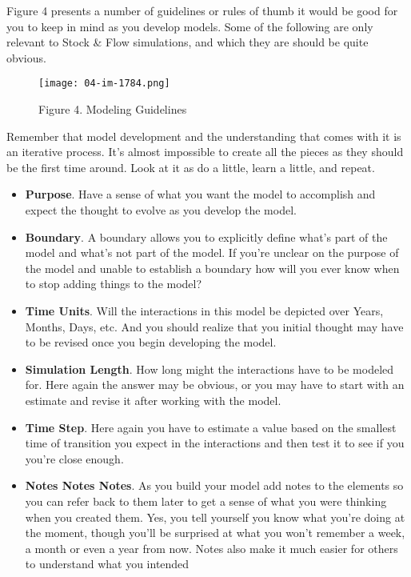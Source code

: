 \documentclass[]{memoir}
\makeatletter
\def\maxwidth{\ifdim\Gin@nat@width>\linewidth\linewidth
\else\Gin@nat@width\fi}
\let\Oldincludegraphics\includegraphics
\renewcommand{\includegraphics}[1]{\Oldincludegraphics[width=\maxwidth]{#1}}
\makeatother
\begin{document}
Figure 4 presents a number of guidelines or rules of thumb it would be
good for you to keep in mind as you develop models. Some of the
following are only relevant to Stock \& Flow simulations, and which they
are should be quite obvious.

\begin{figure}[htbp]
\centering
\texttt{[image: 04-im-1784.png]}
\caption{Figure 4. Modeling Guidelines}
\end{figure}

Remember that model development and the understanding that comes with it
is an iterative process. It's almost impossible to create all the pieces
as they should be the first time around. Look at it as do a little,
learn a little, and repeat.

\begin{itemize}
\itemsep1pt\parskip0pt
\item
  \textbf{Purpose}. Have a sense of what you want the model to
  accomplish and expect the thought to evolve as you develop the model.
\item
  \textbf{Boundary}. A boundary allows you to explicitly define what's
  part of the model and what's not part of the model. If you're unclear
  on the purpose of the model and unable to establish a boundary how
  will you ever know when to stop adding things to the model?
\item
  \textbf{Time Units}. Will the interactions in this model be depicted
  over Years, Months, Days, etc. And you should realize that you initial
  thought may have to be revised once you begin developing the model.
\item
  \textbf{Simulation Length}. How long might the interactions have to be
  modeled for. Here again the answer may be obvious, or you may have to
  start with an estimate and revise it after working with the model.
\item
  \textbf{Time Step}. Here again you have to estimate a value based on
  the smallest time of transition you expect in the interactions and
  then test it to see if you you're close enough.
\item
  \textbf{Notes Notes Notes}. As you build your model add notes to the
  elements so you can refer back to them later to get a sense of what
  you were thinking when you created them. Yes, you tell yourself you
  know what you're doing at the moment, though you'll be surprised at
  what you won't remember a week, a month or even a year from now. Notes
  also make it much easier for others to understand what you intended

\end{itemize}
\end{document}
